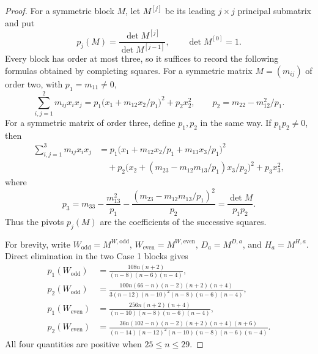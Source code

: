 \documentclass[11pt]{article}
\numberwithin{equation}{section}
\theoremstyle{remark}
\begin{document}
\begin{proof}
For a symmetric block $M$, let $M^{[j]}$ be its leading $j\times j$
principal submatrix and put
{
\begin{equation*}
 p_j(M)=\frac{\det M^{[j]}}{\det M^{[j-1]}},
 \qquad \det M^{[0]}=1.
\end{equation*}
}
 Every block has order at most three,
so it suffices to record the following formulas obtained by completing squares.
For a symmetric matrix $M=(m_{ij})$ of order two, with $p_1=m_{11}\ne0$,
{
\[
 \sum_{i,j=1}^2m_{ij}x_ix_j
 =p_1\bigl(x_1+m_{12}x_2/p_1\bigr)^2+p_2x_2^2,
 \qquad p_2=m_{22}-m_{12}^2/p_1.
\]
}
 For a symmetric matrix of order three, define $p_1,p_2$ in the same way.
If $p_1p_2\ne0$, then
{
\[
\begin{aligned}
 \sum_{i,j=1}^3m_{ij}x_ix_j
 &=p_1\bigl(x_1+m_{12}x_2/p_1+m_{13}x_3/p_1\bigr)^2\\
 &\quad+p_2\bigl(x_2+(m_{23}-m_{12}m_{13}/p_1)x_3/p_2\bigr)^2
       +p_3x_3^2,
\end{aligned}
\]
}
 where
{
\[
 p_3=m_{33}-\frac{m_{13}^2}{p_1}
       -\frac{(m_{23}-m_{12}m_{13}/p_1)^2}{p_2}
     =\frac{\det M}{p_1p_2}.
\]
}
Thus the pivots $p_j(M)$ are the coefficients of the successive squares.

For brevity, write $W_{\mathrm{odd}}=M^{W,\mathrm{odd}}$,
$W_{\mathrm{even}}=M^{W,\mathrm{even}}$, $D_a=M^{D,a}$, and
$H_a=M^{H,a}$.  Direct elimination in the two Case  1 blocks gives
{
\begin{align*}
 p_1(W_{\mathrm{odd}})
 &=\frac{108n(n+2)}{(n-8)(n-6)(n-4)},\\
 p_2(W_{\mathrm{odd}})
 &=\frac{100n(66-n)(n-2)(n+2)(n+4)}
 {3(n-12)(n-10)^2(n-8)(n-6)(n-4)},\\
 p_1(W_{\mathrm{even}})
 &=\frac{256n(n+2)(n+4)}
 {(n-10)(n-8)(n-6)(n-4)},\\
 p_2(W_{\mathrm{even}})
 &=\frac{36n(102-n)(n-2)(n+2)(n+4)(n+6)}
 {(n-14)(n-12)^2(n-10)(n-8)(n-6)(n-4)}.
\end{align*}
}
 All four quantities are positive when $25\le n\le29$.


\end{proof}
\end{document}
